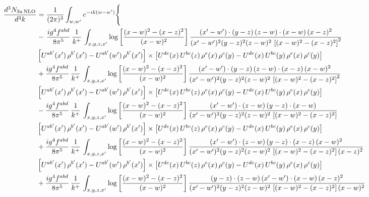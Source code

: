 \documentclass[9pt]{article}
\numberwithin{equation}{section}
\begin{document}
{\begin{align*}
\end{align*}
\begin{align*}
\frac{d^{3}N_{3a\,\rm NLO}}{d^{3}k} & = \frac{1}{(2\pi)^{3}}\int_{w,w'}e^{-ik(w-w')}\Bigg\{\notag \\
& -\,\frac{ig^{4}f^{abd}}{8\pi^{5}}\,\frac{1}{k^{+}}\,\int_{x,y,z,x'}\log{\left[\frac{(x-w)^{2}-(x-z)^{2}}{(x-w)^{2}}\right]}\,
\frac{(x'-w')\cdot(y-z)\,(z-w)\cdot(x-w)\,(x-z)^{2}}{(x'-w')^{2}(y-z)^{2}(z-w)^{2}\,\left[(x-w)^{2}-(x-z)^{2}\right]^{2}}\notag \\ & \left[U^{ab'}(x')\,\rho^{b'}(x')-U^{ab'}(w')\, \rho^{b'}(x')\right]\times \left[U^{de}(x)\,U^{bc}(z)\, \rho^{e}(x)\,\rho^{c}(y)-U^{de}(x)\,U^{bc}(y)\,\rho^{e}(x)\,\rho^{c}(y)\right] \notag \\
& +\frac{ig^{4}f^{abd}}{8\pi^{5}}\,\frac{1}{k^{+}}\,\int_{x,y,z,x'}\log{\left[\frac{(x-w)^{2}-(x-z)^{2}}{(x-w)^{2}}\right]}\,
\frac{(x'-w')\cdot(y-z)\,(z-w)\cdot(x-z)\,(x-w)^{2}}{(x'-w')^{2}(y-z)^{2}(z-w)^{2}\,\left[(x-w)^{2}-(x-z)^{2}\right]^{2}}\notag \\ 
&\left[U^{ab'}(x')\,\rho^{b'}(x')-U^{ab'}(w')\, \rho^{b'}(x')\right]\times \left[U^{de}(x)\,U^{bc}(z)\, \rho^{e}(x)\,\rho^{c}(y)-U^{de}(x)\,U^{bc}(y)\,\rho^{e}(x)\,\rho^{c}(y)\right] \notag \\
& -\frac{ig^{4}f^{abd}}{8\pi^{5}}\,\frac{1}{k^{+}}\,\int_{x,y,z,x'}\log{\left[\frac{(x-w)^{2}-(x-z)^{2}}{(x-w)^{2}}\right]}\,
\frac{(x'-w')\cdot(z-w)\,(y-z)\cdot(x-w)}{(x'-w')^{2}(y-z)^{2}(z-w)^{2}\,\left[(x-w)^{2}-(x-z)^{2}\right]}\notag \\ & \left[U^{ab'}(x')\,\rho^{b'}(x')-U^{ab'}(w')\, \rho^{b'}(x')\right]\times \left[U^{de}(x)\,U^{bc}(z)\, \rho^{e}(x)\,\rho^{c}(y)-U^{de}(x)\,U^{bc}(y)\,\rho^{e}(x)\,\rho^{c}(y)\right] \notag \\
&  +\frac{ig^{4}f^{abd}}{8\pi^{5}}\,\frac{1}{k^{+}}\,\int_{x,y,z,x'}\log{\left[\frac{(x-w)^{2}-(x-z)^{2}}{(x-w)^{2}}\right]}\,
\frac{(x'-w')\cdot(z-w)\,(y-z)\cdot(x-z)\,(x-w)^{2}}{(x'-w')^{2}(y-z)^{2}(z-w)^{2}\,\left[(x-w)^{2}-(x-z)^{2}\right](x-z)^{2}}\notag \\ & \left[U^{ab'}(x')\,\rho^{b'}(x')-U^{ab'}(w')\, \rho^{b'}(x')\right]\times \left[U^{de}(x)\,U^{bc}(z)\, \rho^{e}(x)\,\rho^{c}(y)-U^{de}(x)\,U^{bc}(y)\,\rho^{e}(x)\,\rho^{c}(y)\right] \notag \\
& +\frac{ig^{4}f^{abd}}{8\pi^{5}}\,\frac{1}{k^{+}}\,\int_{x,y,z,x'}\log{\left[\frac{(x-w)^{2}-(x-z)^{2}}{(x-w)^{2}}\right]}\,
\frac{(y-z)\cdot(z-w)\,(x'-w')\cdot(x-w)\,(x-z)^{2}}{(x'-w')^{2}(y-z)^{2}(z-w)^{2}\,\left[(x-w)^{2}-(x-z)^{2}\right](x-w)^{2}}\notag \\ 

\end{align*}}
\end{document}
